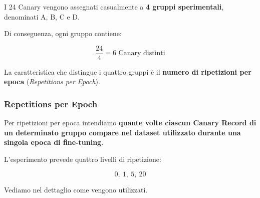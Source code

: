 I 24 Canary vengono assegnati casualmente a
\textbf{4 gruppi sperimentali}, denominati A, B, C e D.

Di conseguenza, ogni gruppo contiene:

\[
\frac{24}{4} = \boxed{6 \text{ Canary distinti}}
\]

La caratteristica che distingue i quattro gruppi
è il \textbf{numero di ripetizioni per epoca}
(\textit{Repetitions per Epoch}).

\subsubsection{Repetitions per Epoch}

Per ripetizioni per epoca intendiamo
\textbf{quante volte ciascun Canary Record
di un determinato gruppo compare nel dataset
utilizzato durante una singola epoca di fine-tuning}.

L'esperimento prevede quattro livelli di ripetizione:

\[
\boxed{0,\ 1,\ 5,\ 20}
\]

Vediamo nel dettaglio come vengono utilizzati.

